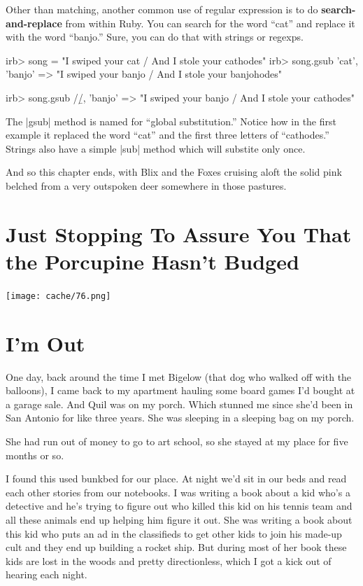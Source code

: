 \documentclass[12pt,twoside]{report}
\begin{document}
Other than matching, another common use of regular expression is to do
{\bf search-and-replace} from within Ruby. You can search for the word
``cat'' and replace it with the word ``banjo.''  Sure, you can do that
with strings or regexps.


\begin{consolecode}

 irb> song = "I swiped your cat / And I stole your cathodes"
 irb> song.gsub 'cat', 'banjo'
   => "I swiped your banjo / And I stole your banjohodes"

 irb> song.gsub /\bcat\b/, 'banjo'
   => "I swiped your banjo / And I stole your cathodes"

\end{consolecode}


The \rubyinline|gsub| method is named for ``global
substitution.''  Notice how in the first example it replaced the word
``cat'' and the first three letters of ``cathodes.''  Strings also
have a simple \rubyinline|sub| method which will
substite only once.

And so this chapter ends, with Blix and the Foxes cruising aloft the
solid pink belched from a very outspoken deer somewhere in those
pastures.


\section{Just Stopping To Assure You That the Porcupine Hasn't Budged}


	\texttt{[image: cache/76.png]}


\section{I'm Out}



One day, back around the time I met Bigelow (that dog who walked off
with the balloons), I came back to my apartment hauling some board
games I'd bought at a garage sale.  And Quil was on my porch.  Which
stunned me since she'd been in San Antonio for like three years.  She
was sleeping in a sleeping bag on my porch.

She had run out of money to go to art school, so she stayed at my
place for five months or so.

I found this used bunkbed for our place.  At night we'd sit in our
beds and read each other stories from our notebooks.  I was writing a
book about a kid who's a detective and he's trying to figure out who
killed this kid on his tennis team and all these animals end up
helping him figure it out.  She was writing a book about this kid who
puts an ad in the classifieds to get other kids to join his made-up
cult and they end up building a rocket ship.  But during most of her
book these kids are lost in the woods and pretty directionless, which
I got a kick out of hearing each night.
\end{document}
